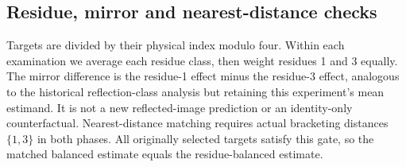 \subsection{Residue, mirror and nearest-distance checks}
Targets are divided by their physical index modulo four. Within each examination we average each residue class, then weight residues 1 and 3 equally. The mirror difference is the residue-1 effect minus the residue-3 effect, analogous to the historical reflection-class analysis but retaining this experiment's mean estimand. It is not a new reflected-image prediction or an identity-only counterfactual. Nearest-distance matching requires actual bracketing distances $\{1,3\}$ in both phases. All originally selected targets satisfy this gate, so the matched balanced estimate equals the residue-balanced estimate.

